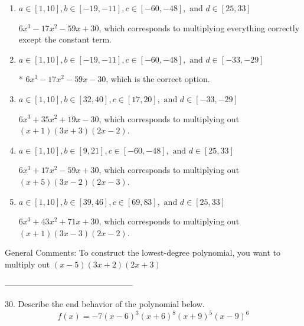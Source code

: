 \documentclass{extbook}[14pt]
\begin{document}
\begin{enumerate}[label=\Alph*.] 
\item $ a \in [1, 10], b \in [-19, -11], c \in [-60, -48], \text{ and } d \in [25, 33] $ 

 $6x^{3} -17 x^{2} -59 x + 30$, which corresponds to multiplying everything correctly except the constant term. 
\item $ a \in [1, 10], b \in [-19, -11], c \in [-60, -48], \text{ and } d \in [-33, -29] $ 

 * $6x^{3} -17 x^{2} -59 x -30$, which is the correct option. 
\item $ a \in [1, 10], b \in [32, 40], c \in [17, 20], \text{ and } d \in [-33, -29] $ 

 $6x^{3} +35 x^{2} +19 x -30$, which corresponds to multiplying out $(x + 1)(3x + 3)(2x -2)$. 
\item $ a \in [1, 10], b \in [9, 21], c \in [-60, -48], \text{ and } d \in [25, 33] $ 

 $6x^{3} +17 x^{2} -59 x + 30$, which corresponds to multiplying out $(x + 5)(3x -2)(2x -3)$. 
\item $ a \in [1, 10], b \in [39, 46], c \in [69, 83], \text{ and } d \in [25, 33] $ 

 $6x^{3} +43 x^{2} +71 x + 30$, which corresponds to multiplying out $(x + 1)(3x -3)(2x -2)$. 
\end{enumerate} 
 
General Comments: To construct the lowest-degree polynomial, you want to multiply out $(x -5)(3x + 2)(2x + 3)$

-----------------------------------------------

30. Describe the end behavior of the polynomial below.
\[ f(x) = -7(x - 6)^{3}(x + 6)^{8}(x + 9)^{5}(x - 9)^{6} \] 
\end{document}
